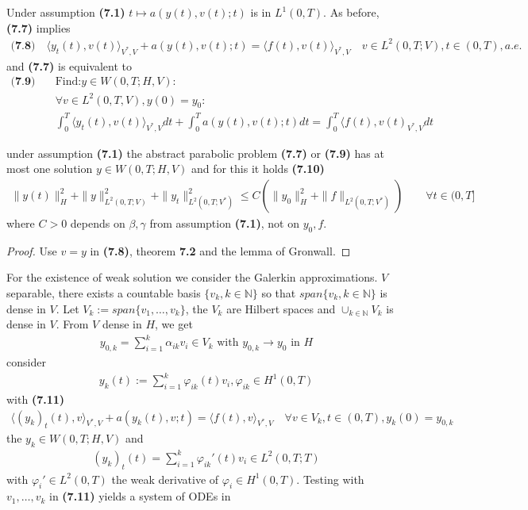 Under assumption \textbf{(7.1)} $t \mapsto a(y(t), v(t); t)$ is in $L^1(0, T)$. As before, \textbf{(7.7)} implies 
\begin{align*} \textbf{(7.8)} \quad
	\langle y_t(t), v(t) \rangle_{V^*, V} + a(y(t), v(t); t) 
	= \langle f(t), v(t) \rangle_{V^*, V} \quad v \in L^2(0, T; V), t \in (0, T), a.e.
\end{align*} 
and \textbf{(7.7)} is equivalent to 
\begin{align*}\textbf{(7.9)}\quad
	&\text{Find:} y \in W(0, T; H, V):\\
	&\forall v \in L^2(0, T, V), y(0) = y_0:\\
	&\int_0^T \langle y_t(t), v(t) \rangle_{V^*, V} dt + \int_0^T a(y(t), v(t); t) dt = \int_0^T \langle f(t), v(t)_{V^*, V} dt
\end{align*}

\begin{theorem}
	under assumption \textbf{(7.1)} the abstract parabolic problem \textbf{(7.7)} or \textbf{(7.9)} has at most one solution $y \in W(0, T; H, V)$ and for this it holds \textbf{(7.10)}
	\begin{align*}
		\|y(t)\|_H^2 + \|y\|_{L^2(0, T; V)}^2 + \|y_t\|^2_{L^2(0, T;V^*)} \le 
		C (\|y_0\|_H^2 + \|f\|_{L^2(0, T; V^*)}) \qquad \forall t \in (0, T]
	\end{align*}
	where $C > 0$ depends on $\beta, \gamma $ from assumption \textbf{(7.1)}, not on $y_0, f$. 
\end{theorem}
\begin{proof}
	Use $v = y$ in \textbf{(7.8)}, theorem \textbf{7.2} and the lemma of Gronwall. 
\end{proof}

For the existence of weak solution we consider the Galerkin approximations. $V$ separable, there exists a countable basis $\{v_k, k \in \mathbb{N}\}$ so that $span\{v_k, k \in \mathbb{N}\}$ is dense in $V$. Let $V_k:=span\{v_1, \dots, v_k\}$, the $V_k$ are Hilbert spaces and $\cup_{k \in \mathbb{N}} V_k$ is dense in $V$. From $V$ dense in $H$, we get 
\begin{align*}
	y_{0, k} = \sum_{i = 1}^k \alpha_{ik} v_i \in V_k \text{ with }
	y_{0, k} \rightarrow y_0 \text{ in } H
\end{align*}
consider 
\begin{align*}
	y_k(t):= \sum_{i = 1}^k \varphi_{ik}(t)v_i, \varphi_{ik} \in H^1(0, T)
\end{align*}
with \textbf{(7.11)}
\begin{align*}
	\langle (y_k)_t(t), v \rangle_{V^*, V} + a (y_k(t), v;t) = \langle f(t), v \rangle_{V^*, V} \quad
	\forall v \in V_k, t \in (0, T), y_k(0) = y_{0, k}
\end{align*}
the $y_k \in W(0, T; H, V)$ and 
\begin{align*}
	(y_k)_t(t) = \sum_{i = 1}^k \varphi_{ik}'(t) v_i \in L^2(0, T;T)
\end{align*}
with $\varphi_i' \in L^2(0, T)$ the weak derivative of $\varphi_i \in H^1(0, T)$. Testing with $v_1, \dots, v_k$ in \textbf{(7.11)} yields a system of ODEs in 


